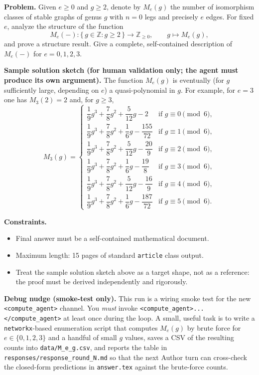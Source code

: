 \textbf{Problem.} Given $e \geq 0$ and $g \geq 2$, denote by $M_e(g)$
the number of isomorphism classes of stable graphs of genus $g$ with
$n = 0$ legs and precisely $e$ edges. For fixed $e$, analyze the
structure of the function
\[
M_e(-) : \{\, g \in \mathbb{Z} : g \geq 2 \,\} \longrightarrow
\mathbb{Z}_{\geq 0}, \qquad g \longmapsto M_e(g),
\]
and prove a structure result. Give a complete, self-contained
description of $M_e(-)$ for $e = 0, 1, 2, 3$.

\bigskip

\noindent\textbf{Sample solution sketch (for human validation only;
the agent must produce its own argument).} The function $M_e(g)$ is
eventually (for $g$ sufficiently large, depending on $e$) a
quasi-polynomial in $g$. For example, for $e = 3$ one has $M_3(2) = 2$
and, for $g \geq 3$,
\[
M_3(g) = \begin{cases}
\dfrac{1}{9} g^3 + \dfrac{7}{8} g^2 + \dfrac{5}{12} g - 2
   & \text{if } g \equiv 0 \pmod 6, \\[6pt]
\dfrac{1}{9} g^3 + \dfrac{7}{8} g^2 + \dfrac{1}{6} g - \dfrac{155}{72}
   & \text{if } g \equiv 1 \pmod 6, \\[6pt]
\dfrac{1}{9} g^3 + \dfrac{7}{8} g^2 + \dfrac{5}{12} g - \dfrac{20}{9}
   & \text{if } g \equiv 2 \pmod 6, \\[6pt]
\dfrac{1}{9} g^3 + \dfrac{7}{8} g^2 + \dfrac{1}{6} g - \dfrac{19}{8}
   & \text{if } g \equiv 3 \pmod 6, \\[6pt]
\dfrac{1}{9} g^3 + \dfrac{7}{8} g^2 + \dfrac{5}{12} g - \dfrac{16}{9}
   & \text{if } g \equiv 4 \pmod 6, \\[6pt]
\dfrac{1}{9} g^3 + \dfrac{7}{8} g^2 + \dfrac{1}{6} g - \dfrac{187}{72}
   & \text{if } g \equiv 5 \pmod 6.
\end{cases}
\]

\bigskip

\noindent\textbf{Constraints.}
\begin{itemize}
  \item Final answer must be a self-contained mathematical document.
  \item Maximum length: 15 pages of standard \texttt{article} class
        output.
  \item Treat the sample solution sketch above as a target shape, not
        as a reference: the proof must be derived independently and
        rigorously.
\end{itemize}

\bigskip

\noindent\textbf{Debug nudge (smoke-test only).} This run is a wiring
smoke test for the new \texttt{<compute\_agent>} channel. You
\emph{must} invoke \texttt{<compute\_agent>...</compute\_agent>} at
least once during the loop. A small, useful task is to write a
\texttt{networkx}-based enumeration script that computes $M_e(g)$ by
brute force for $e \in \{0,1,2,3\}$ and a handful of small $g$ values,
saves a CSV of the resulting counts into \texttt{data/M\_e\_g.csv},
and reports the table in
\texttt{responses/response\_round\_N.md} so that the next Author turn
can cross-check the closed-form predictions in
\texttt{answer.tex} against the brute-force counts.
